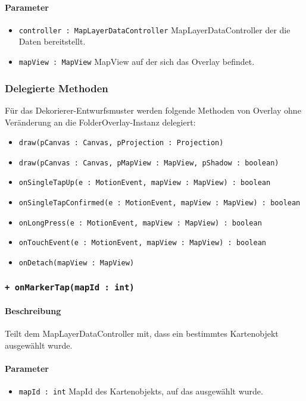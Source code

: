 \paragraph*{Parameter}
\begin{itemize}
    \item \texttt{controller : MapLayerDataController} MapLayerDataController der die Daten bereitstellt.
    \item \texttt{mapView : MapView} MapView auf der sich das Overlay befindet.
\end{itemize}

\subsubsection*{Delegierte Methoden}
Für das Dekorierer-Entwurfsmuster werden folgende Methoden von Overlay ohne Veränderung 
an die FolderOverlay-Instanz delegiert:
\begin{itemize}
    \item \texttt{draw(pCanvas : Canvas, pProjection : Projection)}
    \item \texttt{draw(pCanvas : Canvas, pMapView : MapView, pShadow : boolean)}
    \item \texttt{onSingleTapUp(e : MotionEvent, mapView : MapView) : boolean}
    \item \texttt{onSingleTapConfirmed(e : MotionEvent, mapView : MapView) : boolean}
    \item \texttt{onLongPress(e : MotionEvent, mapView : MapView) : boolean}
    \item \texttt{onTouchEvent(e : MotionEvent, mapView : MapView) : boolean}
    \item \texttt{onDetach(mapView : MapView)}
\end{itemize}

\subsubsection*{\texttt{+ onMarkerTap(mapId : int)}}%
\paragraph*{Beschreibung}
Teilt dem MapLayerDataController mit, dass ein bestimmtes Kartenobjekt ausgewählt wurde.
\paragraph*{Parameter}
\begin{itemize}
    \item \texttt{mapId : int} MapId des Kartenobjekts, auf das ausgewählt wurde.
\end{itemize}
